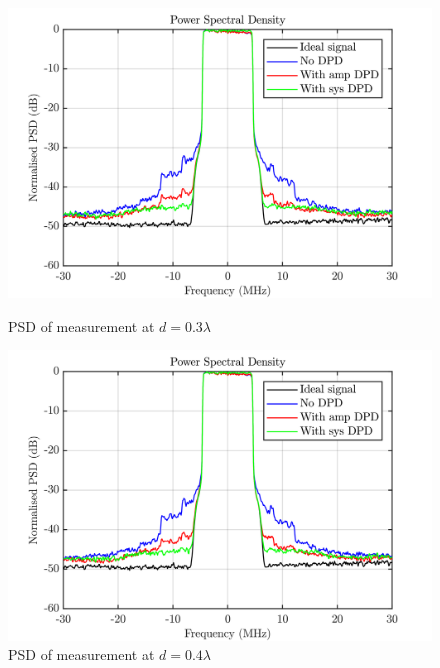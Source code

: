 \begin{figure}[H]
  \centering
  \begin{minipage}[b]{0.5\textwidth}
	\includegraphics[scale = 0.5]{figures/measurement/cree/meas3/psd_0p3.png}
	\caption{PSD of measurement at $d = 0.3\lambda$ }	
    \label{fig:meas3_psd3}
  \end{minipage}
  \hfill
  \begin{minipage}[b]{0.4\textwidth}
	\includegraphics[scale = 0.5]{figures/measurement/cree/meas3/psd_0p4.png}
	\caption{PSD of measurement at $d = 0.4\lambda$}
    \label{fig:meas3_psd4}
  \end{minipage}
\end{figure}

